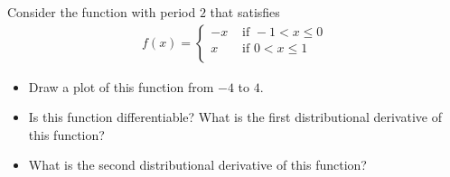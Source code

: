 \documentclass[11pt]{article}
\begin{document}
\begin{exercise}
    Consider the function with period $2$ that satisfies 
    \begin{align}
        f(x) = \begin{cases}
                -x & \text{ if } -1 < x \leq 0 \\
                 x & \text{ if }  0 < x \leq 1 \\
               \end{cases}
    \end{align}
    \begin{itemize}
     \item Draw a plot of this function from $-4$ to $4$.
     \item Is this function differentiable? What is the first distributional derivative of this function?
     \item What is the second distributional derivative of this function?
    \end{itemize}
\end{exercise}
\end{document}

